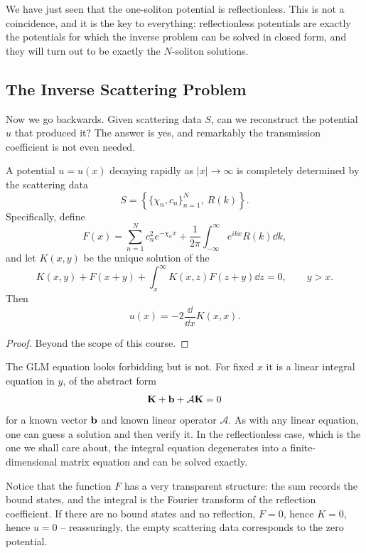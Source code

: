 \documentclass[a4paper]{scrartcl}
\begin{document}
We have just seen that the one-soliton potential is reflectionless. This is not a coincidence, and it is the key to everything: reflectionless potentials are exactly the potentials for which the inverse problem can be solved in closed form, and they will turn out to be exactly the $N$-soliton solutions.

\subsection{The Inverse Scattering Problem}

Now we go backwards. Given scattering data $S$, can we reconstruct the potential $u$ that produced it? The answer is yes, and remarkably the transmission coefficient is not even needed.

\begin{theorem}
	A potential $u = u(x)$ decaying rapidly as $|x|\to\infty$ is completely determined by the scattering data
	$$
	S = \left\{\{\chi_n, c_n\}_{n=1}^N,\ R(k)\right\}.
	$$
	Specifically, define
	$$
	F(x) = \sum_{n=1}^N c_n^2e^{-\chi_n x} + \frac{1}{2\pi}\int_{-\infty}^\infty e^{ikx}R(k)\dd k,
	$$
	and let $K(x,y)$ be the unique solution of the 
	$$
	K(x,y) + F(x+y) + \int_x^\infty K(x,z)F(z+y)\dd z = 0, \qquad y > x.
	$$
	Then
	$$
	u(x) = -2\frac{\dd}{\dd x}K(x,x).
	$$
\end{theorem}
\begin{proof}
	Beyond the scope of this course.
\end{proof}

The GLM equation looks forbidding but is not. For fixed $x$ it is a linear integral equation in $y$, of the abstract form
$$
\mathbf{K} + \mathbf{b} + \mathcal A\mathbf{K} = 0
$$
for a known vector $\mathbf{b}$ and known linear operator $\mathcal A$. As with any linear equation, one can guess a solution and then verify it. In the reflectionless case, which is the one we shall care about, the integral equation degenerates into a finite-dimensional matrix equation and can be solved exactly.

Notice that the function $F$ has a very transparent structure: the sum records the bound states, and the integral is the Fourier transform of the reflection coefficient. If there are no bound states and no reflection, $F = 0$, hence $K = 0$, hence $u = 0$ -- reassuringly, the empty scattering data corresponds to the zero potential.
\end{document}
